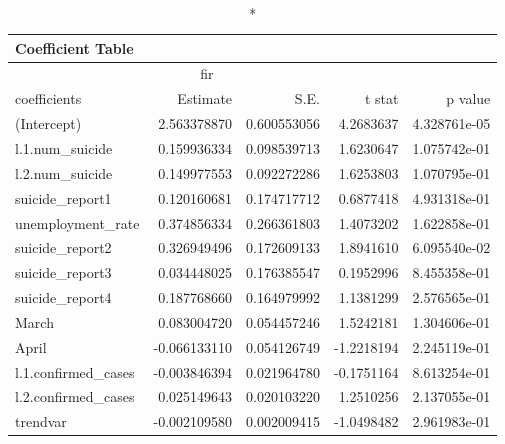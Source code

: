 \begin{longtable}{lrrrr}
\caption*{
{\large Coefficient Table}
} \\ 
\toprule
\multicolumn{4}{c}{fir} &  \\ 
\cmidrule(lr){1-4}
coefficients & Estimate & S.E. & t stat & p value \\ 
\midrule
(Intercept) & 2.563378870 & 0.600553056 & 4.2683637 & 4.328761e-05 \\ 
l.1.num\_suicide & 0.159936334 & 0.098539713 & 1.6230647 & 1.075742e-01 \\ 
l.2.num\_suicide & 0.149977553 & 0.092272286 & 1.6253803 & 1.070795e-01 \\ 
suicide\_report1 & 0.120160681 & 0.174717712 & 0.6877418 & 4.931318e-01 \\ 
unemployment\_rate & 0.374856334 & 0.266361803 & 1.4073202 & 1.622858e-01 \\ 
suicide\_report2 & 0.326949496 & 0.172609133 & 1.8941610 & 6.095540e-02 \\ 
suicide\_report3 & 0.034448025 & 0.176385547 & 0.1952996 & 8.455358e-01 \\ 
suicide\_report4 & 0.187768660 & 0.164979992 & 1.1381299 & 2.576565e-01 \\ 
March & 0.083004720 & 0.054457246 & 1.5242181 & 1.304606e-01 \\ 
April & -0.066133110 & 0.054126749 & -1.2218194 & 2.245119e-01 \\ 
l.1.confirmed\_cases & -0.003846394 & 0.021964780 & -0.1751164 & 8.613254e-01 \\ 
l.2.confirmed\_cases & 0.025149643 & 0.020103220 & 1.2510256 & 2.137055e-01 \\ 
trendvar & -0.002109580 & 0.002009415 & -1.0498482 & 2.961983e-01 \\ 
\bottomrule
\end{longtable}

